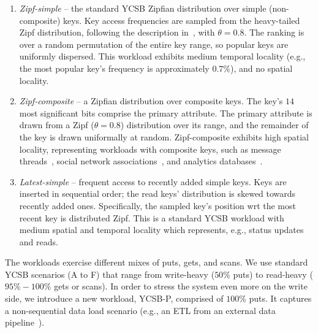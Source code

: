 \begin{enumerate}
\item {\em Zipf-simple} -- the standard YCSB Zipfian distribution over simple (non-composite) keys. 
Key access frequencies are sampled from the heavy-tailed Zipf distribution, 
following the description in~\cite{Gray:1994:QGB:191839.191886}, with $\theta = 0.8$. 
The ranking is over a random permutation of the entire key range, so popular keys are uniformly dispersed.
This workload exhibits 
medium temporal locality (e.g., the most popular key's frequency is approximately $0.7\%$), 
and no spatial locality. 

\item {\em Zipf-composite}  -- a Zipfian distribution over composite keys. 
The key's $14$ most significant bits comprise the primary attribute. 
The primary attribute is drawn from a Zipf ($\theta=0.8$) distribution over its range, 
and  the remainder of the key is drawn uniformally at random.
Zipf-composite exhibits high spatial locality, representing workloads 
with composite keys, such as message threads~\cite{Borthakur:2011:AHG:1989323.1989438},
social network associations~\cite{Armstrong:2013:LDB:2463676.2465296}, and analytics databases~\cite{flurry}. 

\item {\em Latest-simple} -- frequent access to recently added simple keys. 
Keys are inserted in sequential  order; the read keys' distribution is skewed towards recently added ones. 
Specifically, the sampled key's position wrt the most recent key is distributed Zipf. This is a 
standard YCSB workload with medium spatial and temporal locality which represents, e.g., status updates and reads. 


\end{enumerate}

The workloads exercise different mixes of puts, gets, and scans. We use standard YCSB scenarios 
(A to F) that range from write-heavy ($50\%$ puts) to read-heavy ($95\%-100\%$ gets or scans). 
In order to stress the system even more on the write side, we introduce a new workload,  
YCSB-P, comprised of $100\%$ puts. It captures a non-sequential data load scenario (e.g., an ETL 
from an external data pipeline~\cite{flurry}). 

